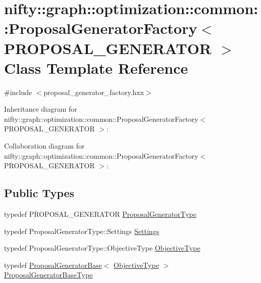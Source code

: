 \hypertarget{classnifty_1_1graph_1_1optimization_1_1common_1_1ProposalGeneratorFactory}{}\section{nifty\+:\+:graph\+:\+:optimization\+:\+:common\+:\+:Proposal\+Generator\+Factory$<$ P\+R\+O\+P\+O\+S\+A\+L\+\_\+\+G\+E\+N\+E\+R\+A\+T\+O\+R $>$ Class Template Reference}
\label{classnifty_1_1graph_1_1optimization_1_1common_1_1ProposalGeneratorFactory}


{\ttfamily \#include $<$proposal\+\_\+generator\+\_\+factory.\+hxx$>$}



Inheritance diagram for nifty\+:\+:graph\+:\+:optimization\+:\+:common\+:\+:Proposal\+Generator\+Factory$<$ P\+R\+O\+P\+O\+S\+A\+L\+\_\+\+G\+E\+N\+E\+R\+A\+T\+O\+R $>$\+:


Collaboration diagram for nifty\+:\+:graph\+:\+:optimization\+:\+:common\+:\+:Proposal\+Generator\+Factory$<$ P\+R\+O\+P\+O\+S\+A\+L\+\_\+\+G\+E\+N\+E\+R\+A\+T\+O\+R $>$\+:
\subsection*{Public Types}
\begin{DoxyCompactItemize}
\item 
typedef P\+R\+O\+P\+O\+S\+A\+L\+\_\+\+G\+E\+N\+E\+R\+A\+T\+O\+R \hyperlink{classnifty_1_1graph_1_1optimization_1_1common_1_1ProposalGeneratorFactory_a9b46a7c0aa62bf69002e98575b47a02f}{Proposal\+Generator\+Type}
\item 
typedef Proposal\+Generator\+Type\+::\+Settings \hyperlink{classnifty_1_1graph_1_1optimization_1_1common_1_1ProposalGeneratorFactory_a547db95d51746a52120043e5060b9746}{Settings}
\item 
typedef Proposal\+Generator\+Type\+::\+Objective\+Type \hyperlink{classnifty_1_1graph_1_1optimization_1_1common_1_1ProposalGeneratorFactory_af32562409096ce8dc76ff0c6cf7a4da6}{Objective\+Type}
\item 
typedef \hyperlink{classnifty_1_1graph_1_1optimization_1_1common_1_1ProposalGeneratorBase}{Proposal\+Generator\+Base}$<$ \hyperlink{classnifty_1_1graph_1_1optimization_1_1common_1_1ProposalGeneratorFactory_af32562409096ce8dc76ff0c6cf7a4da6}{Objective\+Type} $>$ \hyperlink{classnifty_1_1graph_1_1optimization_1_1common_1_1ProposalGeneratorFactory_a51fb7fb1fead374c7db7e4ba99872218}{Proposal\+Generator\+Base\+Type}
\end{DoxyCompactItemize}
